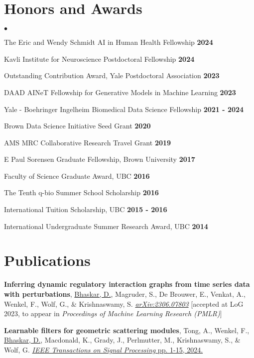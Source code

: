 \documentclass[margin,line]{res}
\newenvironment{list2}{
  \begin{list}{$\bullet$}{
      \setlength{\itemsep}{0in}
      \setlength{\parsep}{0in} \setlength{\parskip}{0in}
      \setlength{\topsep}{0in} \setlength{\partopsep}{0in}
      \setlength{\leftmargin}{0.2in}}}{\end{list}}
\begin{document}
\begin{resume}
\vspace*{.12cm}

\section{\sc Honors and Awards}
\begin{list2}
\setlength\itemsep{0.25em}
\item The Eric and Wendy Schmidt AI in Human Health Fellowship \hfill {\bf 2024}
\item Kavli Institute for Neuroscience Postdoctoral Fellowship \hfill {\bf 2024}
\item Outstanding Contribution Award, Yale Postdoctoral Association \hfill {\bf 2023}
\item DAAD AINeT Fellowship for Generative Models in Machine Learning \hfill {\bf 2023}
\item Yale - Boehringer Ingelheim Biomedical Data Science Fellowship \hfill {\bf 2021 - 2024}
\item Brown Data Science Initiative Seed Grant \hfill {\bf 2020}
\item AMS MRC Collaborative Research Travel Grant \hfill {\bf 2019}
\item E Paul Sorensen Graduate Fellowship, Brown University \hfill {\bf 2017}
\item Faculty of Science Graduate Award, UBC \hfill {\bf 2016}
\item The Tenth q-bio Summer School Scholarship \hfill {\bf 2016}
\item International Tuition Scholarship, UBC \hfill {\bf 2015 - 2016}
\item International Undergraduate Summer Research Award, UBC \hfill {\bf 2014}
\end{list2}

\section{\sc Publications}
{
\renewcommand\leftmargini{0em}
\begin{etaremune}[start=18]
\item{\bf Inferring dynamic regulatory interaction graphs from time series data with perturbations},
\underline{Bhaskar, D.}, Magruder, S., De Brouwer, E., Venkat, A., Wenkel, F., Wolf, G., \& Krishnaswamy, S.
\href{https://arxiv.org/abs/2306.07803}{\textit{arXiv:2306.07803}} [accepted at LoG 2023, to appear in \textit{Proceedings of Machine Learning Research (PMLR)}]
\item{\bf Learnable filters for geometric scattering modules},
Tong, A., Wenkel, F., \underline{Bhaskar, D.}, Macdonald, K., Grady, J., Perlmutter, M., Krishnaswamy, S., \& Wolf, G.
\href{https://doi.org/10.1109/TSP.2024.3378001}{\textit{IEEE Transactions on Signal Processing} pp. 1-15, 2024.}
\end{etaremune}
} 


\end{resume}
\end{document}
